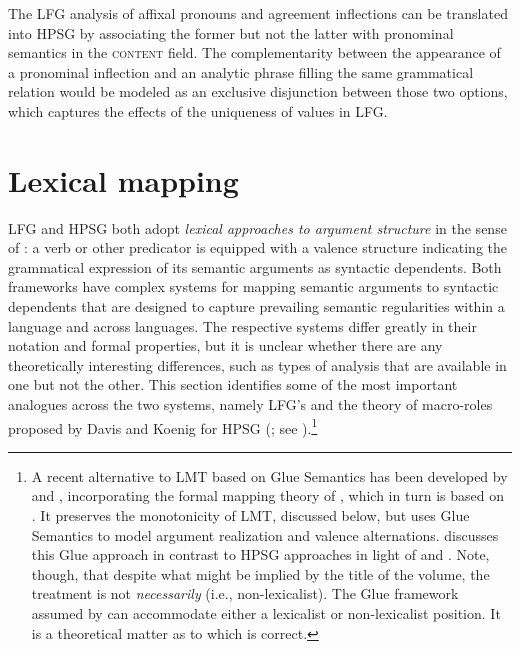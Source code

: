 The LFG analysis of  affixal pronouns and agreement inflections can be translated into HPSG by associating the former but not the latter with pronominal semantics in the \textsc{content} field.  
The complementarity between the appearance of a pronominal inflection and an analytic phrase filling the same grammatical relation would be modeled as an exclusive disjunction between those two options, which captures the effects of the uniqueness of  values in LFG.  
                  
                  
\section{Lexical mapping}
LFG and HPSG both adopt \textit{lexical approaches to argument structure} in the sense of \citet{MWArgSt}: a verb or other predicator is equipped with a valence structure indicating the grammatical expression of its semantic arguments as syntactic dependents.  Both frameworks have complex systems for mapping semantic arguments to syntactic dependents that are designed to capture prevailing semantic regularities within a language and across languages.   The respective systems differ greatly in their notation and formal properties, but it is unclear whether 
there are any theoretically interesting differences, such as types of analysis that are available in one but not the other.  This section identifies some of the most important  analogues across the two systems, namely LFG's  \citep[LMT;][Chapter 14]{BATW2016a} and the theory of macro-roles proposed by Davis and Koenig for HPSG (\citealt{Davis96a-u,DK2000b-u}; see ).\footnote{A recent alternative to LMT based on Glue Semantics has been developed by \citet{asudeh;giorgolo-lfg12} and \citet{asudeh;ea14-lfg}, incorporating the formal mapping theory of \citet{findlay16}, which in turn is based on \citet{kibort07}. It preserves the monotonicity of LMT, discussed below, but uses Glue Semantics to model argument realization and valence alternations. \citet{MuellerLFGphrasal} discusses this Glue approach in contrast to HPSG approaches in light of  and . Note, though, that despite what might be implied by the title of the \citeauthor{MuellerLFGphrasal} volume, the \citeauthor{asudeh;ea14-lfg} treatment is not \emph{necessarily}  (i.e., non-lexicalist). The  Glue framework assumed by \citeauthor{asudeh;ea14-lfg} can accommodate either a lexicalist or non-lexicalist position. It is a theoretical matter as to which is correct.}
 
